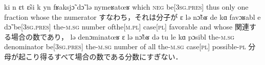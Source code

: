 \documentclass[main.tex]{subfiles}
\begin{document}
\begin{leftbar}
         {ki n {ɛt{\liaison}} \~{ɛ}si {k{\liaison}} yn fʁaksj\~{ɔ} d\~{ɔ} lə {nymeʁatœʁ\liaison}}
         {which \textsc{neg} {be[3\textsc{sg}.\textsc{pres}]} thus only one fraction whose the numerator}
         {すなわち，それは分子が}
         {ɛ lə n\~{ɔ}bʁ de kɑ favɔʁabl e d\~{ɔ}}
         {{be[3\textsc{sg}.\textsc{pres}]} the-\textsc{m}.\textsc{sg} number {of{\textunderscore}the[\textsc{m}.\textsc{pl}]} {case[\textsc{pl}]} favorable and whose}
         {関連する場合の数であり，}
         {lə {denɔminatœʁ\liaison} ɛ lə n\~{ɔ}bʁ də tu le kɑ pɔsibl}
         {the-\textsc{m}.\textsc{sg} denominator {be[3\textsc{sg}.\textsc{pres}]} the-\textsc{m}.\textsc{sg} number of all the-\textsc{m}.\textsc{sg} case[\textsc{pl}] possible-\textsc{pl}}
         {分母が起こり得るすべて場合の数である分数にすぎない．}
\end{leftbar}
\end{document}

